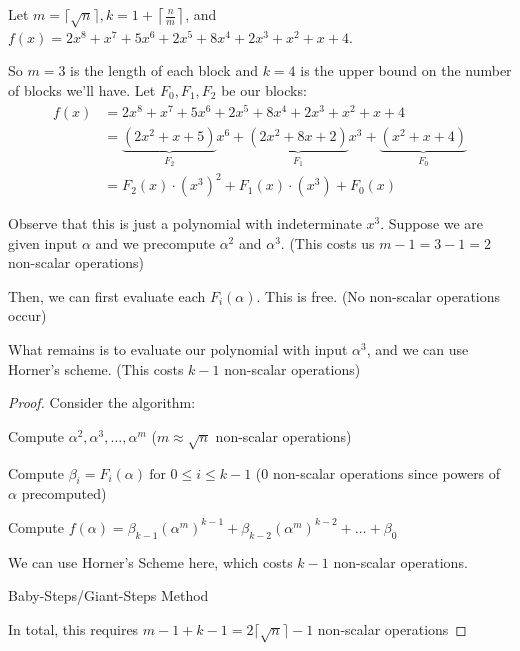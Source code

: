 \begin{example}{}{}
    Let $m = \lceil \sqrt{n} \rceil, k = 1 + \left\lceil \frac{n}{m} \right\rceil$, and $f(x) = 2x^8 + x^7 + 5x^6 + 2x^5 + 8x^4 + 2x^3 + x^2 + x + 4$.

    So $m = 3$ is the length of each block and $k = 4$ is the upper bound on the number of blocks we'll have.
    Let $F_0, F_1, F_2$ be our blocks:
    \begin{align*}
        f(x) &= 2x^8 + x^7 + 5x^6 + 2x^5 + 8x^4 + 2x^3 + x^2 + x + 4 \\
        &= \underbrace{(2x^2 + x + 5)}_{F_2}x^6 + 
        \underbrace{(2x^2 + 8x + 2)}_{F_1}x^3 + 
        \underbrace{(x^2 + x + 4)}_{F_0} \\
        &= F_2(x)\cdot(x^3)^2 + F_1(x)\cdot(x^3) + F_0(x)
    \end{align*}

    Observe that this is just a polynomial with indeterminate $x^3$.
    Suppose we are given input $\alpha$ and we precompute $\alpha^2$ and $\alpha^3$. (This costs us $m - 1 = 3 - 1 = 2$ non-scalar operations)
    
    Then, we can first evaluate each $F_i(\alpha)$.
    This is free. (No non-scalar operations occur)

    What remains is to evaluate our polynomial with input $\alpha^3$, and we can use Horner's scheme. (This costs $k - 1$ non-scalar operations)
\end{example}

\begin{proof}
    Consider the algorithm:

    \IncMargin{1em}
    \begin{algorithm}[H]
        \nl Compute $\alpha^2, \alpha^3, \ldots, \alpha^m$ ($m \approx \sqrt{n}$ non-scalar operations)

        \nl Compute $\beta_i = F_i(\alpha) \ \text{for } 0 \leq i \leq k - 1$ ($0$ non-scalar operations since powers of $\alpha$ precomputed)

        \nl Compute $f(\alpha) = \beta_{k-1}(\alpha^m)^{k-1} + \beta_{k-2}(\alpha^m)^{k-2} + \ldots + \beta_0$

        We can use Horner's Scheme here, which costs $k-1$ non-scalar operations.

        \caption{Baby-Steps/Giant-Steps Method}
    \end{algorithm}

    In total, this requires $m - 1 + k - 1 = 2\lceil\sqrt{n}\rceil - 1$ non-scalar operations
\end{proof}


